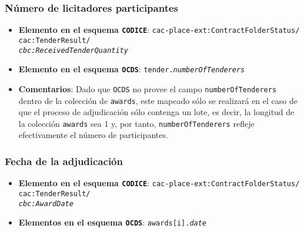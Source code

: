         \subsubsection{Número de licitadores participantes}
            \begin{itemize}
                \item \textbf{Elemento en el esquema \texttt{CODICE}}:
                    \tabto{7.6cm} \texttt{cac-place-ext:ContractFolderStatus/} \\
                    \tabto{7.6cm} \texttt{cac:TenderResult/} \\
                    \tabto{7.6cm} \texttt{\textit{cbc:ReceivedTenderQuantity}}
                \item \textbf{Elemento en el esquema \texttt{OCDS}}:
                    \tabto{7.6cm} \texttt{tender.\textit{numberOfTenderers}}
                \item \textbf{Comentarios}: Dado que \texttt{OCDS} no provee el campo \texttt{numberOfTenderers} dentro de la colección de \texttt{awards}, este mapeado sólo se realizará en el caso de que el proceso de adjudicación sólo contenga un lote, es decir, la longitud de la colección \texttt{awards} sea 1 y, por tanto, \texttt{numberOfTenderers} refleje efectivamente el número de participantes.
            \end{itemize}
            
        \subsubsection{Fecha de la adjudicación}
            \begin{itemize}
                \item \textbf{Elemento en el esquema \texttt{CODICE}}:
                    \tabto{7.6cm} \texttt{cac-place-ext:ContractFolderStatus/} \\
                    \tabto{7.6cm} \texttt{cac:TenderResult/} \\
                    \tabto{7.6cm} \texttt{\textit{cbc:AwardDate}}
                \item \textbf{Elementos en el esquema \texttt{OCDS}}:
                    \tabto{7.6cm} \texttt{awards[i].\textit{date}}
            \end{itemize}
            
